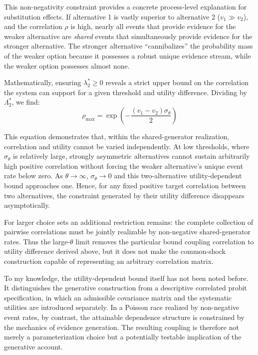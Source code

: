 \documentclass[
  man,
  floatsintext,
  longtable,
  a4paper,
  nolmodern,
  notxfonts,
  notimes,
  colorlinks=true,linkcolor=blue,citecolor=blue,urlcolor=blue]{apa7}
\begin{document}
This non-negativity constraint provides a concrete process-level
explanation for substitution effects. If alternative 1 is vastly
superior to alternative 2 (\(v_1 \gg v_2\)), and the correlation
\(\rho\) is high, nearly all events that provide evidence for the weaker
alternative are \emph{shared} events that simultaneously provide
evidence for the stronger alternative. The stronger alternative
``cannibalizes'' the probability mass of the weaker option because it
possesses a robust unique evidence stream, while the weaker option
possesses almost none.

Mathematically, ensuring \(\lambda_2^* \ge 0\) reveals a strict upper
bound on the correlation the system can support for a given threshold
and utility difference. Dividing by \(\Lambda_2^*\), we find: \[
\rho_{\max} = \exp\left(-\frac{(v_1 - v_2) \sigma_\theta}{2}\right)
\]

This equation demonstrates that, within the shared-generator
realization, correlation and utility cannot be varied independently. At
low thresholds, where \(\sigma_\theta\) is relatively large, strongly
asymmetric alternatives cannot sustain arbitrarily high positive
correlation without forcing the weaker alternative's unique event rate
below zero. As \(\theta \to \infty\), \(\sigma_\theta \to 0\) and this
two-alternative utility-dependent bound approaches one. Hence, for any
fixed positive target correlation between two alternatives, the
constraint generated by their utility difference disappears
asymptotically.

For larger choice sets an additional restriction remains: the complete
collection of pairwise correlations must be jointly realizable by
non-negative shared-generator rates. Thus the large-\(\theta\) limit
removes the particular bound coupling correlation to utility difference
derived above, but it does not make the common-shock construction
capable of representing an arbitrary correlation matrix.

To my knowledge, the utility-dependent bound itself has not been noted
before. It distinguishes the generative construction from a descriptive
correlated probit specification, in which an admissible covariance
matrix and the systematic utilities are introduced separately. In a
Poisson race realized by non-negative event rates, by contrast, the
attainable dependence structure is constrained by the mechanics of
evidence generation. The resulting coupling is therefore not merely a
parameterization choice but a potentially testable implication of the
generative account.
\end{document}
